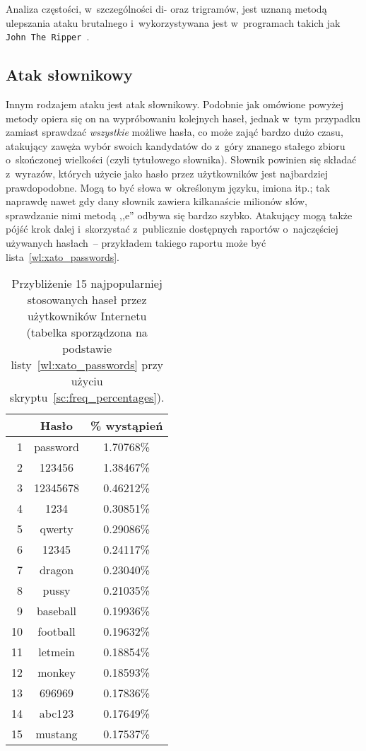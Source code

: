 Analiza częstości, w~szczególności di- oraz trigramów, jest uznaną metodą
ulepszania ataku brutalnego i~wykorzystywana jest w~programach takich jak
\texttt{John The Ripper}~\cite{john_the_ripper_modes}.



\subsection{Atak słownikowy}
\label{sec:dictionary_attacks}%
Innym rodzajem ataku jest atak słownikowy. Podobnie jak omówione powyżej metody
opiera się on na wypróbowaniu kolejnych haseł, jednak w~tym przypadku zamiast
sprawdzać \emph{wszystkie} możliwe hasła, co może zająć bardzo dużo czasu,
atakujący zawęża wybór swoich kandydatów do z~góry znanego stałego zbioru
o~skończonej wielkości (czyli tytułowego słownika). Słownik powinien się
składać z~wyrazów, których użycie jako hasło przez użytkowników jest
najbardziej prawdopodobne. Mogą to być słowa w~określonym języku, imiona itp.;
tak naprawdę nawet gdy dany słownik zawiera kilkanaście milionów słów,
sprawdzanie nimi metodą ,,e'' odbywa się bardzo szybko. Atakujący
mogą także pójść krok dalej i~skorzystać z~publicznie dostępnych raportów
o~najczęściej używanych hasłach~-- przykładem takiego raportu może być
lista~\ref{wl:xato_passwords}.

    \begin{table}[htb]
        \caption{Przybliżenie 15 najpopularniej stosowanych haseł przez
        użytkowników Internetu (tabelka sporządzona na podstawie
        listy~\ref{wl:xato_passwords} przy użyciu
        skryptu~\ref{sc:freq_percentages}).}
        \begin{tabular}{|r||c|c|}
            \hline
            & Hasło & \small \% wystąpień \\
            \hline
            1  & password & 1.70768\% \\
            2  & 123456   & 1.38467\% \\
            3  & 12345678 & 0.46212\% \\
            4  & 1234     & 0.30851\% \\
            5  & qwerty   & 0.29086\% \\
            6  & 12345    & 0.24117\% \\
            7  & dragon   & 0.23040\% \\
            8  & pussy & 0.21035\% \\
            9  & baseball & 0.19936\% \\
            10 & football & 0.19632\% \\
            11 & letmein  & 0.18854\% \\
            12 & monkey   & 0.18593\% \\
            13 & 696969   & 0.17836\% \\
            14 & abc123   & 0.17649\% \\
            15 & mustang  & 0.17537\% \\
            \hline
        \end{tabular}
    \end{table}

